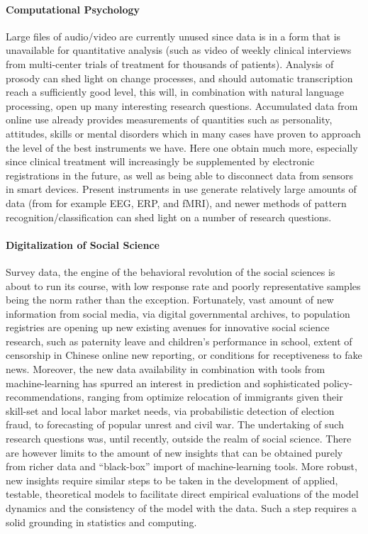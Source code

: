 \documentclass[a4paper,10pt]{article}
\begin{document}
\paragraph{Computational Psychology}
Large files of audio/video are currently unused since data is in a form that is unavailable for quantitative analysis (such as video of weekly clinical interviews from multi-center trials of treatment for thousands of patients). Analysis of prosody can shed light on change processes, and should automatic transcription reach a sufficiently good level, this will, in combination with natural language processing, open up many interesting research questions.
Accumulated data from online use already provides measurements of quantities such as personality, attitudes, skills or mental disorders which in many cases have proven to approach the level of the best instruments we have. Here one obtain much more, especially since clinical treatment will increasingly be supplemented by electronic registrations in the future, as well as being able to disconnect data from sensors in smart devices. Present instruments in use generate relatively large amounts of data (from for example EEG, ERP, and fMRI), and newer methods of pattern recognition/classification can shed light on a number of research questions.
\paragraph{Digitalization of Social Science}
Survey data, the engine of the behavioral revolution of the social sciences is about to run its course, with low response rate and poorly representative samples being the norm rather than the exception. Fortunately, vast amount of new information from social media, via digital governmental archives, to population registries are opening up new existing avenues for innovative social science research, such as paternity leave and children’s performance in school, extent of censorship in Chinese online new reporting, or conditions for receptiveness to fake news. Moreover, the new data availability in combination with tools from machine-learning has spurred an interest in prediction and sophisticated policy-recommendations, ranging from optimize relocation of immigrants given their skill-set and local labor market needs, via probabilistic detection of election fraud, to forecasting of popular unrest and civil war. The undertaking of such research questions was, until recently, outside the realm of social science. There are however limits to the amount of new insights that can be obtained purely from richer data and “black-box” import of machine-learning tools. More robust, new insights require similar steps to be taken in the development of applied, testable, theoretical models to facilitate direct empirical evaluations of the model dynamics and the consistency of the model with the data. Such a step requires a solid grounding in statistics and computing. 
\end{document}
